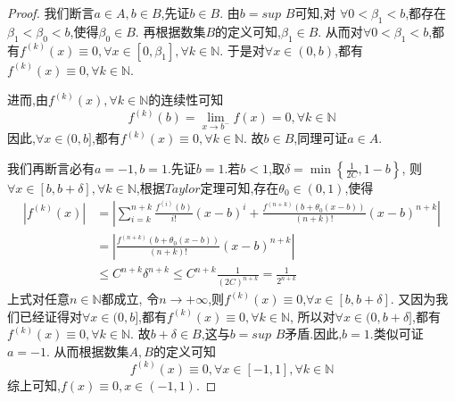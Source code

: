 \documentclass[lang=cn,newtx,10pt,scheme=chinese]{../Template/elegantbook}
\begin{document}
\begin{exercise}
\begin{proof}
        我们断言$a\in A,b\in B$,先证$b\in B$.
        由$b=sup\,\,B$可知,对
        $\forall 0<\beta_1<b$,都存在$\beta_1<\beta_0<b$,使得$\beta_0\in B$.
        再根据数集$B$的定义可知,$\beta_1\in B$.
        从而对$\forall 0<\beta_1<b$,都有$f^{\left( k \right)}\left( x \right) \equiv 0,\forall x\in \left[ 0,\beta_1 \right] ,\forall k\in \mathbb{N}$.
        于是对$\forall x\in(0,b)$,都有$f^{(k)}(x)\equiv0,\forall k\in \mathbb{N}$.

        进而,由$f^{(k)}(x),\forall k\in \mathbb{N}$的连续性可知
        \begin{equation}
            f^{\left( k \right)}\left( b \right) =\underset{x\rightarrow b^-}{\lim}f\left( x \right) =0,\forall k\in \mathbb{N}
            \nonumber
        \end{equation}
        因此,$\forall x\in(0,b]$,都有$f^{(k)}(x)\equiv0,\forall k\in\mathbb{N}$.
        故$b\in B$,同理可证$a\in A$.

        我们再断言必有$a=-1,b=1$.先证$b=1$.若$b<1$,取$\delta=\min \left\{ \frac{1}{2C},1-b \right\}$,
        则$\forall x\in[b,b+\delta],\forall k\in\mathbb{N}$,根据$Taylor$定理可知,存在$\theta_0\in(0,1)$,使得
        \begin{equation}
            \begin{split}
                \left| f^{\left( k \right)}\left( x \right) \right|&=\left| \sum_{i=k}^{n+k}{\frac{f^{\left( i \right)}\left( b \right)}{i!}\left( x-b \right) ^i}+\frac{f^{\left( n+k \right)}\left( b+\theta _0\left( x-b \right) \right)}{\left( n+k \right) !}\left( x-b \right) ^{n+k} \right|
\\
&=\left| \frac{f^{\left( n+k \right)}\left( b+\theta _0\left( x-b \right) \right)}{\left( n+k \right) !}\left( x-b \right) ^{n+k} \right|
\\
&\leqslant C^{n+k}\delta ^{n+k}\leqslant C^{n+k}\frac{1}{\left( 2C \right) ^{n+k}}=\frac{1}{2^{n+k}}
            \end{split}
            \nonumber
        \end{equation}
        上式对任意$n\in\mathbb{N}$都成立,
        令$n \to +\infty$,则$f^{(k)}(x)\equiv0$,$\forall x\in[b,b+\delta]$.
        又因为我们已经证得对$\forall x\in(0,b]$,都有$f^{(k)}(x)\equiv0,\forall k\in\mathbb{N}$,
        所以对$\forall x\in(0,b+\delta]$,都有$f^{(k)}(x)\equiv0,\forall k\in\mathbb{N}$.
        故$b+\delta \in B$,这与$b=sup\,\,B$矛盾.因此,$b=1$.类似可证$a=-1$.
        从而根据数集$A,B$的定义可知
        \begin{equation}
            f^{\left( k \right)}\left( x \right) \equiv 0,\forall x\in \left[ -1,1 \right] ,\forall k\in \mathbb{N} 
            \nonumber
        \end{equation}
        综上可知,$f(x)\equiv0,x\in(-1,1)$.
    \end{proof}
\end{exercise}
\end{document}
